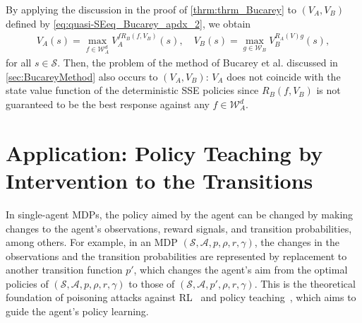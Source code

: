 \documentclass{acml}
\begin{document}
By applying the discussion in the proof of \cref{thrm:thrm_Bucarey} to $(V_A,V_B)$ defined by \cref{eq:quasi-SEeq_Bucarey_apdx_2}, we obtain
\begin{align}
	V_A(s)=\max_{f\in\mathcal{W}_A^d}V_A^{fR_B(f,V_B)}(s),\quad V_B(s)=\max_{g\in\mathcal{W}_B}V_B^{R_A(V)g}(s),
\end{align}
for all $s\in\mathcal{S}$.
Then, the problem of the method of Bucarey et al. discussed in \cref{sec:BucareyMethod} also occurs to $(V_A,V_B)$: $V_A$ does not coincide with the state value function of the deterministic SSE policies since $R_B(f,V_B)$ is not guaranteed to be the best response against any $f\in\mathcal{W}_A^d$.




\section{Application: Policy Teaching by Intervention to the Transitions}\label{sec:application}

In single-agent MDPs, the policy aimed by the agent can be changed by making changes to the agent's observations, reward signals, and transition probabilities, among others.
For example, in an MDP $(\mathcal{S},\mathcal{A},p,\rho,r,\gamma)$, the changes in the observations and the transition probabilities are represented by replacement to another transition function $p'$, which changes the agent's aim from the optimal policies of $(\mathcal{S},\mathcal{A},p,\rho,r,\gamma)$ to those of $(\mathcal{S},\mathcal{A},p',\rho,r,\gamma)$.
This is the theoretical foundation of poisoning attacks against RL~\citep{Behzadan2017-vs,Huang2019-bh,Zhang2020-ai,Rakhsha2020-sc,Sun2020-bo} and policy teaching~\citep{Zhang2008-ll,Zhang2009-oz}, which aims to guide the agent's policy learning.
\end{document}
